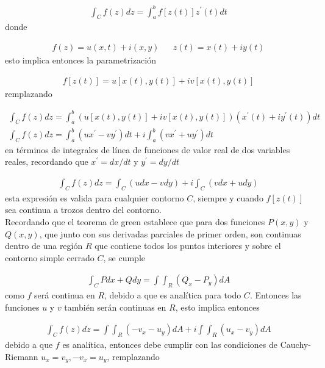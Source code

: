 \begin{gather}
    \int_C f(z)dz = \int_{a}^{b}f[z(t)]z^{\prime}(t)dt
\end{gather}
donde 

\begin{align*}
    f(z) = u(x,t) + i(x,y) && z(t) = x(t) + iy(t)
\end{align*}
esto implica entonces la parametrización

\begin{gather*}
    f[z(t)] = u[x(t), y(t)] + iv[x(t),y(t)]
\end{gather*}
remplazando

\begin{gather*}
    \int_C f(z)dz = \int_{a}^{b} \left( u[x(t), y(t)] + iv[x(t),y(t)]\right)\left(x^{\prime}(t) + iy^{\prime}(t)\right)dt\\
    \int_C f(z)dz = \int_{a}^{b} \left( ux^{\prime} - vy^{\prime}\right)dt     + i\int_{a}^{b}\left(vx^{\prime} + uy^{\prime}\right)dt
\end{gather*}
en términos de integrales de línea de funciones de valor real de dos variables reales, recordando que $x^{\prime} = dx/dt$ y $y^{\prime} = dy/dt$ 

\begin{gather}
    \int_C f(z)dz = \int_{C} \left( u dx - vdy\right) + i\int_{C}\left(v dx + udy\right)
\end{gather}
esta expresión es valida para cualquier contorno $C$, siempre y cuando $f[z(t)]$ sea continua a trozos dentro del contorno. \newline \\
Recordando que el teorema de green establece que para dos funciones $P(x,y)$ y $Q(x,y)$, que junto con sus derivadas parciales de primer orden, son continuas dentro de una región $R$ que contiene todos los puntos interiores y sobre el contorno simple cerrado $C$, se cumple 

\begin{gather}
    \int_C Pdx + Qdy  = \int\int_R (Q_x - P_y)dA
\end{gather}
como $f$ será continua en $R$, debido a que es analítica para todo $C$. Entonces las funciones $u$ y $v$ también serán continuas en $R$, esto implica entonces 

\begin{gather*}
    \int_C f(z)dz = \int\int_R (-v_x - u_y)dA  + i\int\int_R (u_x - v_y)dA
\end{gather*}
debido a que $f$ es analítica, entonces debe cumplir con las condiciones de Cauchy-Riemann $u_x = v_y, -v_x = u_y$, remplazando 

